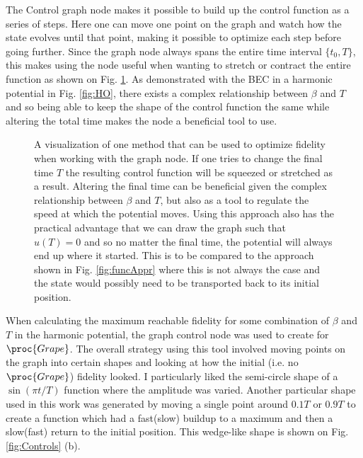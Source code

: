 \documentclass[a4paper, twocolumn]{revtex4-1}
\begin{document}
The Control graph node makes it possible to build up the control function as a series of steps. Here one can move one point on the graph and watch how the state evolves until that point, making it possible to optimize each step before going further. Since the graph node always spans the entire time interval $\{t_0,T\}$, this makes using the node useful when wanting to stretch or contract the entire function as shown on Fig. \ref{fig:graphAppr}. As demonstrated with the BEC in a harmonic potential in Fig. \ref{fig:HO}, there exists a complex relationship between $\beta$ and $T$ and so being able to keep the shape of the control function the same while altering the total time makes the node a beneficial tool to use.\\

\begin{figure}
	\def\svgwidth{\columnwidth}
	
	\caption{A visualization of one method that can be used to optimize fidelity when working with the graph node. If one tries to change the final time $T$ the resulting control function will be squeezed or stretched as a result. Altering the final time can be beneficial given the complex relationship between $\beta$ and $T$, but also as a tool to regulate the speed at which the potential moves. Using this approach also has the practical advantage that we can draw the graph such that $u(T)=0$ and so no matter the final time, the potential will always end up where it started. This is to be compared to the approach shown in Fig. \ref{fig:funcAppr} where this is not always the case and the state would possibly need to be transported back to its initial position.}
	\label{fig:graphAppr}
\end{figure}

When calculating the maximum reachable fidelity for some combination of $\beta$ and $T$ in the harmonic potential, the graph control node was used to create for $\proc{Grape}$. The overall strategy using this tool involved moving points on the graph into certain shapes and looking at how the initial (i.e. no $\proc{Grape}$) fidelity looked. I particularly liked the semi-circle shape of a $\sin(\pi t/T)$ function where the amplitude was varied. Another particular shape used in this work was generated by moving a single point around $0.1T$ or $0.9T$ to create a function which had a fast(slow) buildup to a maximum and then a slow(fast) return to the initial position. This wedge-like shape is shown on Fig. \ref{fig:Controls} (b).
\end{document}
